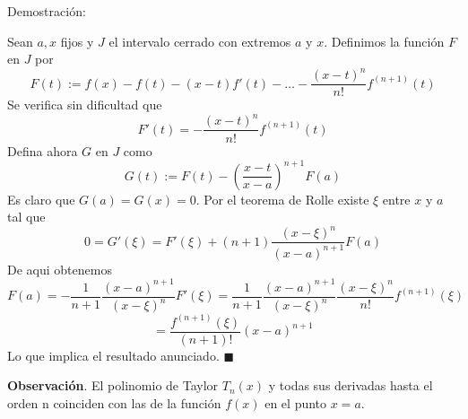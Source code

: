 \documentclass[12pt]{book}
\begin{document}
Demostración:

Sean $a,x$ fijos y $J$ el intervalo cerrado con extremos $a$ y $x$.
Definimos la función $F$ en $J$ por $$F(t):=f(x)-f(t)-(x-t)f'(t)-\dots-\frac{(x-t)^n}{n!}f^{(n+1)}(t)$$
Se verifica sin dificultad que $$F'(t)=-\frac{(x-t)^n}{n!}f^{(n+1)}(t)$$
Defina ahora $G$ en $J$ como $$G(t):=F(t)-\left(\frac{x-t}{x-a}\right)^{n+1}F(a)$$
Es claro que $G(a)=G(x)=0$. Por el teorema de Rolle existe $\xi$ entre $x$ y $a$ tal que $$0=G'(\xi)=F'(\xi)+(n+1)\frac{(x-\xi)^n}{(x-a)^{n+1}}F(a)$$
De aqui obtenemos $$F(a)=-\frac{1}{n+1}\frac{(x-a)^{n+1}}{(x-\xi)^n}F'(\xi)=\frac{1}{n+1}\frac{(x-a)^{n+1}}{(x-\xi)^n}\frac{(x-\xi)^n}{n!}f^{(n+1)}(\xi)$$
$$=\frac{f^{(n+1)}(\xi)}{(n+1)!}(x-a)^{n+1}$$
Lo que implica el resultado anunciado. $\blacksquare$

\textbf{Observación}. El polinomio de Taylor $T_n(x)$ y todas sus derivadas hasta el orden n coinciden con las de la función $f(x)$ en el punto $x=a$.
\end{document}
